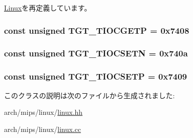 \hyperlink{classLinux_a96e06e042526ea5e89c4e8a020636c52}{Linux}を再定義しています。\hypertarget{classMipsLinux_a90fcc56bd4aa74a5d86c87bfeae77625}{
\subsubsection[{TGT\_\-TIOCGETP}]{\setlength{\rightskip}{0pt plus 5cm}const unsigned {\bf TGT\_\-TIOCGETP} = 0x7408}}
\label{classMipsLinux_a90fcc56bd4aa74a5d86c87bfeae77625}
\hypertarget{classMipsLinux_a6783bea53088dc89157c39a9a7c71988}{
\subsubsection[{TGT\_\-TIOCSETN}]{\setlength{\rightskip}{0pt plus 5cm}const unsigned {\bf TGT\_\-TIOCSETN} = 0x740a}}
\label{classMipsLinux_a6783bea53088dc89157c39a9a7c71988}
\hypertarget{classMipsLinux_a194059e48b091a80833c40b500e70bec}{
\subsubsection[{TGT\_\-TIOCSETP}]{\setlength{\rightskip}{0pt plus 5cm}const unsigned {\bf TGT\_\-TIOCSETP} = 0x7409}}
\label{classMipsLinux_a194059e48b091a80833c40b500e70bec}


このクラスの説明は次のファイルから生成されました:\begin{DoxyCompactItemize}
\item 
arch/mips/linux/\hyperlink{arch_2mips_2linux_2linux_8hh}{linux.hh}\item 
arch/mips/linux/\hyperlink{arch_2mips_2linux_2linux_8cc}{linux.cc}\end{DoxyCompactItemize}
